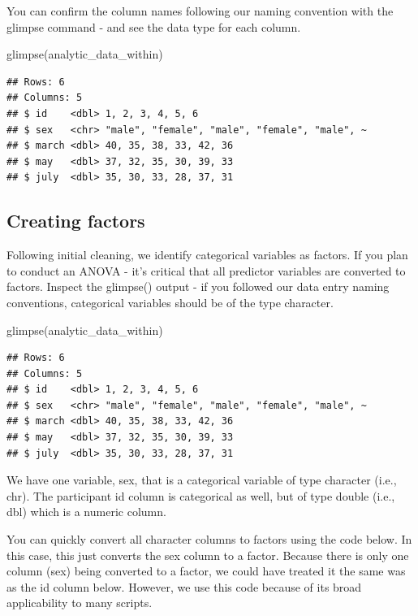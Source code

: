 \documentclass[
]{krantz}
\makeatletter
\newenvironment{Shaded}{\begin{snugshade}}{\end{snugshade}}
\newcommand{\FunctionTok}[1]{\textcolor[rgb]{0,0,0}{#1}}
\newcommand{\NormalTok}[1]{#1}
\newenvironment{kframe}{%
\medskip{}
\setlength{\fboxsep}{.8em}
 \def\at@end@of@kframe{}%
 \ifinner\ifhmode%
  \def\at@end@of@kframe{\end{minipage}}%
  \begin{minipage}{\columnwidth}%
 \fi\fi%
 \def\FrameCommand##1{\hskip\@totalleftmargin \hskip-\fboxsep
 \colorbox{shadecolor}{##1}\hskip-\fboxsep
     \hskip-\linewidth \hskip-\@totalleftmargin \hskip\columnwidth}%
 \MakeFramed {\advance\hsize-\width
   \@totalleftmargin\z@ \linewidth\hsize
   \@setminipage}}%
 {\par\unskip\endMakeFramed%
 \at@end@of@kframe}
\renewenvironment{Shaded}{\begin{kframe}}{\end{kframe}}
\makeatother
\begin{document}
You can confirm the column names following our naming convention with the glimpse command - and see the data type for each column.

\begin{Shaded}
\begin{Highlighting}[]
\FunctionTok{glimpse}\NormalTok{(analytic\_data\_within)}
\end{Highlighting}
\end{Shaded}

\begin{verbatim}
## Rows: 6
## Columns: 5
## $ id    <dbl> 1, 2, 3, 4, 5, 6
## $ sex   <chr> "male", "female", "male", "female", "male", ~
## $ march <dbl> 40, 35, 38, 33, 42, 36
## $ may   <dbl> 37, 32, 35, 30, 39, 33
## $ july  <dbl> 35, 30, 33, 28, 37, 31
\end{verbatim}

\hypertarget{creating-factors-3}{%
\subsection{Creating factors}\label{creating-factors-3}}

Following initial cleaning, we identify categorical variables as factors. If you plan to conduct an ANOVA - it's critical that all predictor variables are converted to factors. Inspect the glimpse() output - if you followed our data entry naming conventions, categorical variables should be of the type character.

\begin{Shaded}
\begin{Highlighting}[]
\FunctionTok{glimpse}\NormalTok{(analytic\_data\_within)}
\end{Highlighting}
\end{Shaded}

\begin{verbatim}
## Rows: 6
## Columns: 5
## $ id    <dbl> 1, 2, 3, 4, 5, 6
## $ sex   <chr> "male", "female", "male", "female", "male", ~
## $ march <dbl> 40, 35, 38, 33, 42, 36
## $ may   <dbl> 37, 32, 35, 30, 39, 33
## $ july  <dbl> 35, 30, 33, 28, 37, 31
\end{verbatim}

We have one variable, sex, that is a categorical variable of type character (i.e., chr). The participant id column is categorical as well, but of type double (i.e., dbl) which is a numeric column.

You can quickly convert all character columns to factors using the code below. In this case, this just converts the sex column to a factor. Because there is only one column (sex) being converted to a factor, we could have treated it the same was as the id column below. However, we use this code because of its broad applicability to many scripts.
\end{document}
